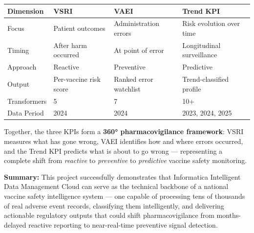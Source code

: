 \documentclass[12pt,a4paper]{report}
\begin{document}
\begin{center}
\begin{tabularx}{\textwidth}{lXXX}
\toprule
\textbf{Dimension}    & \textbf{VSRI} & \textbf{VAEI} & \textbf{Trend KPI} \\
\midrule
Focus        & Patient outcomes        & Administration errors    & Risk evolution over time \\
Timing       & After harm occurred     & At point of error        & Longitudinal surveillance \\
Approach     & Reactive                & Preventive               & Predictive \\
Output       & Per-vaccine risk score  & Ranked error watchlist   & Trend-classified profile \\
Transformers & 5                       & 7                        & 10+                      \\
Data Period  & 2024                    & 2024                     & 2023, 2024, 2025         \\
\bottomrule
\end{tabularx}
\end{center}

\medskip
Together, the three KPIs form a \textbf{360° pharmacovigilance framework}: VSRI measures what has gone wrong, VAEI identifies how and where errors occurred, and the Trend KPI predicts what is about to go wrong — representing a complete shift from \textit{reactive} to \textit{preventive} to \textit{predictive} vaccine safety monitoring.

\begin{mdframed}[linecolor=infblue, linewidth=1.5pt, backgroundcolor={rgb}{0.97,0.97,1.0}]
\textbf{Summary:} This project successfully demonstrates that Informatica Intelligent Data Management Cloud can serve as the technical backbone of a national vaccine safety intelligence system — one capable of processing tens of thousands of real adverse event records, classifying them intelligently, and delivering actionable regulatory outputs that could shift pharmacovigilance from months-delayed reactive reporting to near-real-time preventive signal detection.
\end{mdframed}
\end{document}
